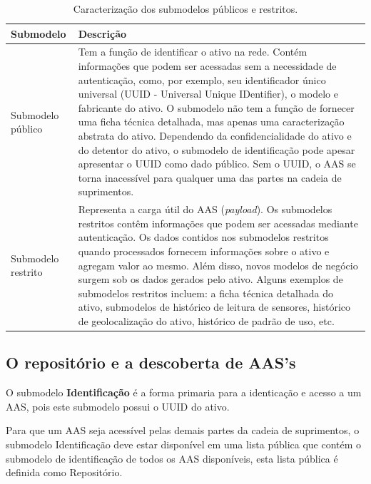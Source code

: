 \documentclass[
	12pt,				%
	oneside,			%
	a4paper,			%
	english,			%
	brazil				%
]{abntex2}
\begin{document}
	
		\begin{table}[H]
		\centering
		\caption{Caracterização dos submodelos públicos e restritos.}
		\begin{tabular}{|p{1.3in}|p{4in}|}
			
			\hline
			\textbf{Submodelo}
			&\textbf{Descrição} \\
			
			\hline
			Submodelo público
			& Tem a função de identificar o ativo na rede. Contém informações que podem ser acessadas sem a necessidade de autenticação, como, por exemplo, seu identificador único universal (UUID - Universal Unique IDentifier), o modelo e fabricante do ativo. O submodelo não tem a função de fornecer uma ficha técnica detalhada, mas apenas uma caracterização abstrata do ativo. Dependendo da confidencialidade do ativo e do detentor do ativo, o submodelo de identificação pode apesar apresentar o UUID como dado público. Sem o UUID, o AAS se torna inacessível para qualquer uma das partes na cadeia de suprimentos. \\
			
			\hline
			Submodelo restrito
			& Representa a carga útil do AAS (\textit{payload}). Os submodelos restritos contêm informações que podem ser acessadas mediante autenticação. Os dados contidos nos submodelos restritos quando processados fornecem informações sobre o ativo e agregam valor ao mesmo. Além disso, novos modelos de negócio surgem sob os dados gerados pelo ativo. Alguns exemplos de submodelos restritos incluem: a ficha técnica detalhada do ativo, submodelos de histórico de leitura de sensores, histórico de geolocalização do ativo, histórico de padrão de uso, etc.\\
			
		
			\hline
			
		\end{tabular}
		\label{tab:submodelos-publicos-restritos}
	\end{table}
	
	\subsection{O repositório e a descoberta de AAS's}
	
	O submodelo \textbf{Identificação} é a forma primaria para a identicação e acesso a um AAS, pois este submodelo possui o UUID do ativo.
	
	Para que um AAS seja acessível pelas demais partes da cadeia de suprimentos, o submodelo Identificação deve estar disponível em uma lista pública que contém o submodelo de identificação de todos os AAS disponíveis, esta lista pública é definida como Repositório.
	
\end{document}
